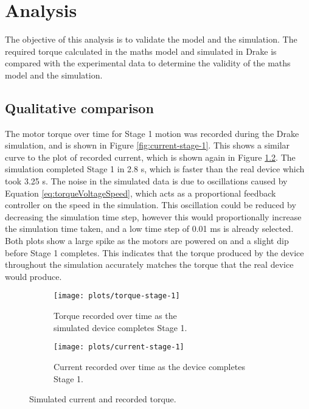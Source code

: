 \chapter{Analysis}

The objective of this analysis is to validate the model and the simulation. The required torque calculated in the maths model and simulated in Drake is compared with the experimental data to determine the validity of the maths model and the simulation.

\section{Qualitative comparison}

The motor torque over time for Stage 1 motion was recorded during the Drake simulation, and is shown in Figure \ref{fig:current-stage-1}. This shows a similar curve to the plot of recorded current, which is shown again in Figure \ref{fig:current-2}. The simulation completed Stage 1 in 2.8 s, which is faster than the real device which took 3.25 s. The noise in the simulated data is due to oscillations caused by Equation \ref{eq:torqueVoltageSpeed}, which acts as a proportional feedback controller on the speed in the simulation. This oscillation could be reduced by decreasing the simulation time step, however this would proportionally increase the simulation time taken, and a low time step of 0.01 ms is already selected. Both plots show a large spike as the motors are powered on and a slight dip before Stage 1 completes. This indicates that the torque produced by the device throughout the simulation accurately matches the torque that the real device would produce.
\begin{figure}
	\centering
	\begin{subfigure}{.5\textwidth}
		\centering
		\texttt{[image: plots/torque-stage-1]}
		\caption{Torque recorded over time as the \\simulated device completes Stage 1.}
		\label{fig:torque-stage-1}
	\end{subfigure}%
	\begin{subfigure}{.5\textwidth}
		\centering
		\texttt{[image: plots/current-stage-1]}
		\caption{Current recorded over time as the device completes Stage 1.}
		\label{fig:current-2}
	\end{subfigure}
	\caption{Simulated current and recorded torque.}
	\label{fig:torque-current}
\end{figure}


